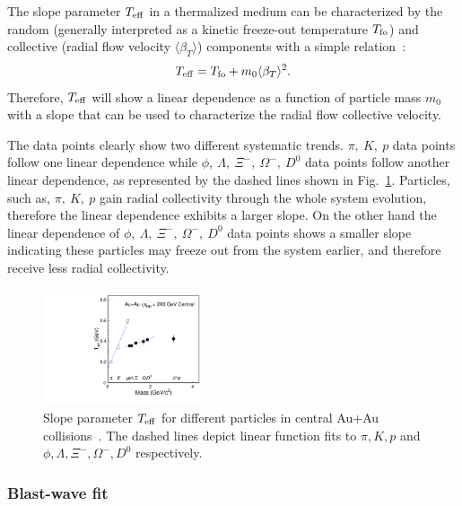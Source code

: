 \documentclass[%
 reprint,	
showpacs,
 amsmath,amssymb,
 aps,
 prc,
]{revtex4-1}
\begin{document}
The slope parameter $T_{\rm eff}$ in a thermalized medium can be characterized by the random (generally interpreted as a kinetic freeze-out temperature $T_{\rm fo}$) and collective (radial flow velocity $\langle\beta_{T}\rangle$) components with a simple relation~\cite{StarWhitePaper,Csorgo:1995bi,Kolb:2003dz}:
\begin{equation}
  \begin{aligned}
T_{\rm eff} = T_{\rm fo} + m_0 \langle\beta_{T}\rangle^2.
  \end{aligned}
\label{equ:equation7}
\end{equation}
Therefore, $T_{\rm eff}$ will show a linear dependence as a function of particle mass $m_0$ with a slope that can be used to characterize the radial flow collective velocity.

The data points clearly show two different systematic trends. $\pi,\ K,\ p$ data points follow one linear dependence while $\phi,\ \Lambda,\ \Xi^{-},\ \Omega^{-},\ D^0$ data points follow another linear dependence, as represented by the dashed lines shown in Fig.~\ref{fig:Teff_ALL}. Particles, such as, $\pi,\ K,\ p$ gain radial collectivity through the whole system evolution, therefore the linear dependence exhibits a larger slope. On the other hand the linear dependence of $\phi,\ \Lambda,\ \Xi^{-},\ \Omega^{-},\ D^0$ data points shows a smaller slope indicating these particles may freeze out from the system earlier, and therefore receive less radial collectivity.


\begin{figure}
\centering
\includegraphics[width=0.43\textwidth]{fig/Teff_ALL.pdf}
\caption{Slope parameter $T_{\rm eff}$ for different particles in central Au+Au collisions~\cite{Adams:2003xp,Abelev:2007rw,Adams:2006ke,Adamczyk:2013tvk}. The dashed lines depict linear function fits to $\pi,K,p$ and $\phi,\Lambda,\Xi^{-},\Omega^{-},D^0$ respectively.}
\label{fig:Teff_ALL} 
\end{figure}


\subsubsection{Blast-wave fit}
\label{result:collectivity:BW}
\end{document}
